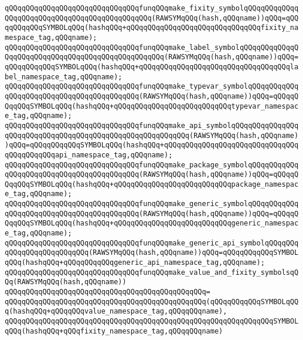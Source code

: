 \verb|qQQqqQQqqQQqqQQqqQQqqQQqqQQqqQQqfunqQQqmake_fixity_symbolqQQqqQQqqQQqqQQqqQQqqQQqqQQqqQQqqQQqqQQqqQQqqQQq(RAWSYMqQQq(hash,qQQqname))qQQq=qQQqqQQqqQQqSYMBOLqQQq(hashqQQq+qQQqqQQqqQQqqQQqqQQqqQQqqQQqqQQqfixity_namespace_tag,qQQqname);|\newline
\verb|qQQqqQQqqQQqqQQqqQQqqQQqqQQqqQQqfunqQQqmake_label_symbolqQQqqQQqqQQqqQQqqQQqqQQqqQQqqQQqqQQqqQQqqQQqqQQqqQQq(RAWSYMqQQq(hash,qQQqname))qQQq=qQQqqQQqqQQqSYMBOLqQQq(hashqQQq+qQQqqQQqqQQqqQQqqQQqqQQqqQQqqQQqqQQqlabel_namespace_tag,qQQqname);|\newline
\verb|qQQqqQQqqQQqqQQqqQQqqQQqqQQqqQQqfunqQQqmake_typevar_symbolqQQqqQQqqQQqqQQqqQQqqQQqqQQqqQQqqQQqqQQqqQQq(RAWSYMqQQq(hash,qQQqname))qQQq=qQQqqQQqqQQqSYMBOLqQQq(hashqQQq+qQQqqQQqqQQqqQQqqQQqqQQqqQQqtypevar_namespace_tag,qQQqname);|\newline
\verb|qQQqqQQqqQQqqQQqqQQqqQQqqQQqqQQqfunqQQqmake_api_symbolqQQqqQQqqQQqqQQqqQQqqQQqqQQqqQQqqQQqqQQqqQQqqQQqqQQqqQQqqQQq(RAWSYMqQQq(hash,qQQqname))qQQq=qQQqqQQqqQQqSYMBOLqQQq(hashqQQq+qQQqqQQqqQQqqQQqqQQqqQQqqQQqqQQqqQQqqQQqqQQqapi_namespace_tag,qQQqname);|\newline
\verb|qQQqqQQqqQQqqQQqqQQqqQQqqQQqqQQqfunqQQqmake_package_symbolqQQqqQQqqQQqqQQqqQQqqQQqqQQqqQQqqQQqqQQqqQQq(RAWSYMqQQq(hash,qQQqname))qQQq=qQQqqQQqqQQqSYMBOLqQQq(hashqQQq+qQQqqQQqqQQqqQQqqQQqqQQqqQQqpackage_namespace_tag,qQQqname);|\newline
\verb|qQQqqQQqqQQqqQQqqQQqqQQqqQQqqQQqfunqQQqmake_generic_symbolqQQqqQQqqQQqqQQqqQQqqQQqqQQqqQQqqQQqqQQqqQQq(RAWSYMqQQq(hash,qQQqname))qQQq=qQQqqQQqqQQqSYMBOLqQQq(hashqQQq+qQQqqQQqqQQqqQQqqQQqqQQqqQQqgeneric_namespace_tag,qQQqname);|\newline
\verb|qQQqqQQqqQQqqQQqqQQqqQQqqQQqqQQqfunqQQqmake_generic_api_symbolqQQqqQQqqQQqqQQqqQQqqQQqqQQq(RAWSYMqQQq(hash,qQQqname))qQQq=qQQqqQQqqQQqSYMBOLqQQq(hashqQQq+qQQqqQQqqQQqgeneric_api_namespace_tag,qQQqname);|\newline
\newline
\verb|qQQqqQQqqQQqqQQqqQQqqQQqqQQqqQQqfunqQQqmake_value_and_fixity_symbolsqQQq(RAWSYMqQQq(hash,qQQqname))|\newline
\verb|qQQqqQQqqQQqqQQqqQQqqQQqqQQqqQQqqQQqqQQqqQQqqQQq=|\newline
\verb|qQQqqQQqqQQqqQQqqQQqqQQqqQQqqQQqqQQqqQQqqQQqqQQq(qQQqqQQqqQQqSYMBOLqQQq(hashqQQq+qQQqqQQqvalue_namespace_tag,qQQqqQQqname),|\newline
\verb|qQQqqQQqqQQqqQQqqQQqqQQqqQQqqQQqqQQqqQQqqQQqqQQqqQQqqQQqqQQqqQQqSYMBOLqQQq(hashqQQq+qQQqfixity_namespace_tag,qQQqqQQqname)|\newline

